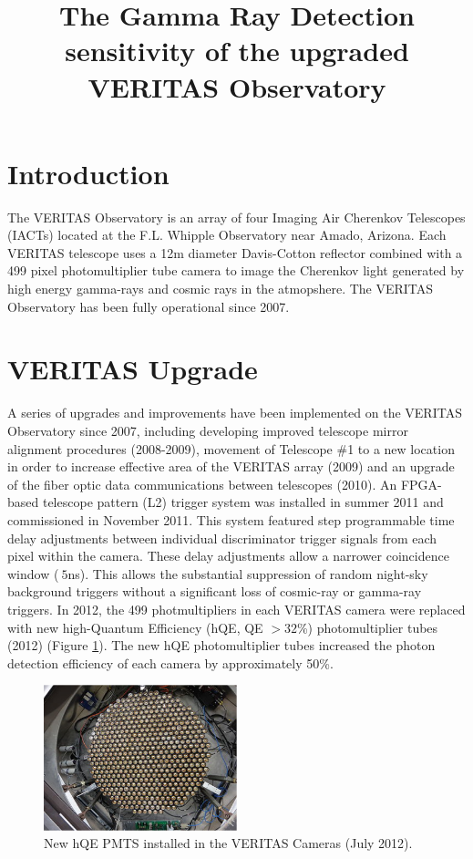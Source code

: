 \documentclass[a4paper]{article}
\title{The Gamma Ray Detection sensitivity of the upgraded VERITAS Observatory}
\begin{document}
\maketitle

\section{Introduction}
The VERITAS Observatory\cite{bib:Holder2011} is an array of four Imaging Air Cherenkov
Telescopes (IACTs)  located at the F.L. Whipple Observatory near Amado, Arizona. Each VERITAS telescope uses a 12m diameter Davis-Cotton reflector combined with a 499 pixel photomultiplier tube camera to image the Cherenkov light generated by high energy gamma-rays and cosmic rays in the atmopshere. The VERITAS Observatory has been fully operational since 2007.


\section{VERITAS Upgrade}
A series of upgrades and improvements have been implemented on the VERITAS Observatory since 2007, including developing improved telescope mirror alignment procedures (2008-2009), movement of Telescope \#1 to a new location in order to increase effective area of the VERITAS array (2009) and an upgrade of the fiber optic data communications between telescopes (2010). An FPGA-based telescope pattern (L2) trigger  system \cite{bib:L2ICRC2013,bib:Zitzer2011} was  installed in summer 2011 and commissioned in November 2011. This system featured step programmable time delay adjustments between individual discriminator trigger signals from each  pixel within the camera. These delay adjustments allow a narrower coincidence window ($~5$ns). This allows the substantial suppression of random night-sky background triggers 
without a significant loss of cosmic-ray or gamma-ray triggers.  In 2012, the 499 photmultipliers in each VERITAS camera were replaced with new high-Quantum Efficiency (hQE, QE $> 32$\%) photomultiplier tubes (2012)\cite{bib:PPMT2011} (Figure \ref{NewPMTs}).  The new hQE photomultiplier tubes increased the photon detection efficiency of each camera by approximately 50\%.  

\begin{figure}[t]
  \centering
  \includegraphics[width=0.5\textwidth]{icrc2013-01}
  \caption{New hQE PMTS installed in the VERITAS Cameras (July 2012).}
  \label{NewPMTs}
 \end{figure}
\end{document}
